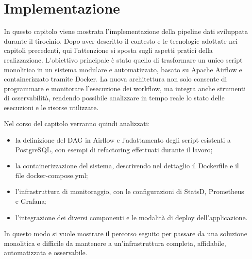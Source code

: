 \chapter{Implementazione}
\label{cha:implementazione}

In questo capitolo viene mostrata l'implementazione della pipeline dati sviluppata durante
il tirocinio. Dopo aver descritto il contesto e le tecnologie adottate nei capitoli precedenti, qui l’attenzione si sposta sugli aspetti pratici della realizzazione.
L’obiettivo principale è stato quello di trasformare un unico script monolitico in un sistema modulare e automatizzato, basato su Apache Airflow e containerizzato tramite Docker. La nuova architettura non solo consente di programmare e monitorare l’esecuzione dei workflow, ma integra anche strumenti di osservabilità, rendendo possibile analizzare in tempo reale lo stato delle esecuzioni e le risorse utilizzate.

Nel corso del capitolo verranno quindi analizzati:


\begin{itemize}
    \item la definizione del DAG in Airflow e l’adattamento degli script esistenti a PostgreSQL, con esempi di refactoring effettuati durante il lavoro;
    \item la containerizzazione del sistema, descrivendo nel dettaglio il Dockerfile e il file docker-compose.yml;
    \item l’infrastruttura di monitoraggio, con le configurazioni di StatsD, Prometheus e Grafana;
    \item l’integrazione dei diversi componenti e le modalità di deploy dell’applicazione.
\end{itemize}

In questo modo si vuole mostrare il percorso seguito per passare da una soluzione monolitica e difficile da mantenere a un’infrastruttura completa, affidabile, automatizzata e osservabile.

